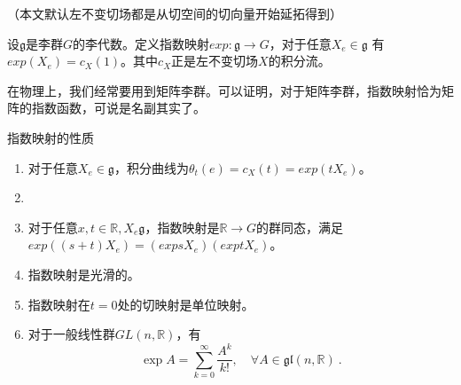 
（本文默认左不变切场都是从切空间的切向量开始延拓得到）
\begin{definition}{}
设$\mathfrak g$是李群$G$的李代数。定义指数映射$exp:\mathfrak g\to G$，对于任意$X_e\in \mathfrak g$ 有$exp(X_e)=c_X(1)$。其中$c_X$正是左不变切场$X$的积分流。
\end{definition}
在物理上，我们经常要用到矩阵李群。可以证明，对于矩阵李群，指数映射恰为矩阵的指数函数，可说是名副其实了。

\begin{theorem}{指数映射的性质}
\begin{enumerate}
\item 对于任意$X_e\in \mathfrak g$，积分曲线为$\theta_t(e)=c_X(t)=exp(tX_e)$。
\item 
\item 对于任意$x,t\in\mathbb R,X_e\mathfrak g$，指数映射是$\mathbb R\to G$的群同态，满足$exp((s+t)X_e)=(expsX_e)(exptX_e)$。
\item 指数映射是光滑的。
\item 指数映射在$t=0$处的切映射是单位映射。
\item 对于一般线性群$GL(n,\mathbb R)$，有
\begin{equation}
\exp A=\sum_{k=0}^\infty\frac{A^k}{k!},\quad \forall A\in\mathfrak{gl}(n,\mathbb{R})~.
\end{equation}
\end{enumerate}
\end{theorem}

